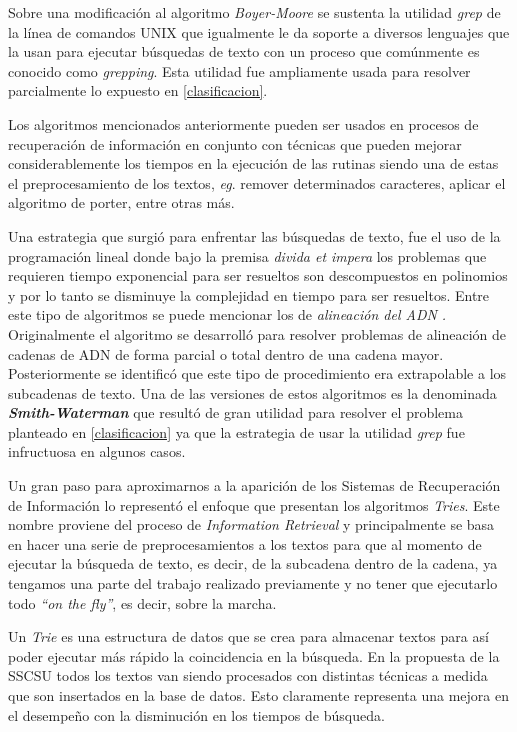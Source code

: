 \documentclass[
  10,
  openany]{book}
\begin{document}
Sobre una modificación al algoritmo \emph{Boyer-Moore} se sustenta la utilidad \emph{grep} de la línea de comandos UNIX que igualmente le da soporte a diversos lenguajes que la usan para ejecutar búsquedas de texto con un proceso que comúnmente es conocido como \emph{grepping}. Esta utilidad fue ampliamente usada para resolver parcialmente lo expuesto en \ref{clasificacion}.

Los algoritmos mencionados anteriormente pueden ser usados en procesos de recuperación de información en conjunto con técnicas que pueden mejorar considerablemente los tiempos en la ejecución de las rutinas siendo una de estas el preprocesamiento de los textos, \emph{eg}. remover determinados caracteres, aplicar el algoritmo de porter, entre otras más.

Una estrategia que surgió para enfrentar las búsquedas de texto, fue el uso de la programación lineal donde bajo la premisa \emph{divida et impera} los problemas que requieren tiempo exponencial para ser resueltos son descompuestos en polinomios y por lo tanto se disminuye la complejidad en tiempo para ser resueltos. Entre este tipo de algoritmos se puede mencionar los de \emph{alineación del ADN .} Originalmente el algoritmo se desarrolló para resolver problemas de alineación de cadenas de ADN de forma parcial o total dentro de una cadena mayor. Posteriormente se identificó que este tipo de procedimiento era extrapolable a los subcadenas de texto. Una de las versiones de estos algoritmos es la denominada \textbf{\emph{Smith-Waterman}} que resultó de gran utilidad para resolver el problema planteado en \ref{clasificacion} ya que la estrategia de usar la utilidad \emph{grep} fue infructuosa en algunos casos.

Un gran paso para aproximarnos a la aparición de los Sistemas de Recuperación de Información lo representó el enfoque que presentan los algoritmos \emph{Tries}. Este nombre proviene del proceso de \emph{Information Retrieval} y principalmente se basa en hacer una serie de preprocesamientos a los textos para que al momento de ejecutar la búsqueda de texto, es decir, de la subcadena dentro de la cadena, ya tengamos una parte del trabajo realizado previamente y no tener que ejecutarlo todo \emph{``on the fly''}, es decir, sobre la marcha.

Un \emph{Trie} \citep{fredkin1960} es una estructura de datos que se crea para almacenar textos para así poder ejecutar más rápido la coincidencia en la búsqueda. En la propuesta de la SSCSU todos los textos van siendo procesados con distintas técnicas a medida que son insertados en la base de datos. Esto claramente representa una mejora en el desempeño con la disminución en los tiempos de búsqueda.
\end{document}
